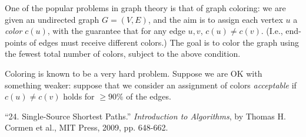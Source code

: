 \documentclass[addpoints]{exam}
\begin{document}
\begin{questions}

One of the popular problems in graph theory is that of graph coloring: we are given an undirected graph $G = (V, E)$, and the aim is to assign each vertex $u$ a {\em color} $c(u)$, with the guarantee that for any edge $u, v$, $c(u) \ne c(v)$.  (I.e., end-points of edges must receive different colors.) The goal is to color the graph using the fewest total number of colors, subject to the above condition.

Coloring is known to be a very hard problem. Suppose we are OK with something weaker: suppose that we consider an assignment of colors {\em acceptable} if $c(u) \ne c(v)$ holds for $\ge 90\%$ of the edges.


\end{questions}

\begin{thebibliography}{9}

 \enquote{24. Single-Source Shortest Paths.} \textit{Introduction to Algorithms}, by Thomas H. Cormen et al., MIT Press, 2009, pp. 648-662.

\end{thebibliography}
\end{document}
